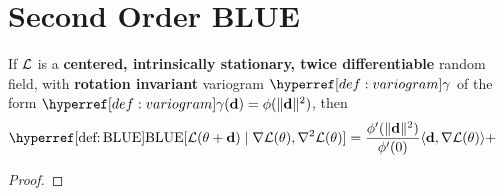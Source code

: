 \section{Second Order BLUE}

\begin{lemma}
	If \(\mathcal{L}\) is a \textbf{centered, intrinsically stationary, twice
	differentiable} random field, with \textbf{rotation invariant} variogram
	\(\variogram\) of the form \(\variogram(\step)=\phi(\|\step\|^2)\), then
	\begin{equation*}
	\begin{aligned}
		\BLUE[\Loss(\param + \step)\mid \grad\Loss(\param), \hessian\Loss(\param)]
		&= \frac{\phi'(\|\step\|^2)}{\phi'(0)}\langle \step, \grad\Loss(\param)\rangle
		+ 
	\end{aligned}
	\end{equation*}
\end{lemma}
\begin{proof}
	
\end{proof}